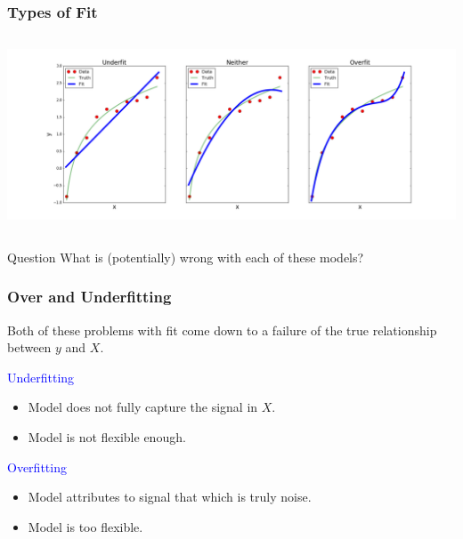 \documentclass{beamer}
\begin{document}
\begin{frame}
  \frametitle{Types of Fit}
  \begin{columns}
    \begin{center}
      \includegraphics[width=\textwidth]{images/overfitting_labeled.png}
    \end{center}
  \end{columns}

  \begin{block}{Question}
    What is (potentially) wrong with each of these models?
  \end{block}
\end{frame}

\begin{frame}
  \frametitle{Over and Underfitting}
  Both of these problems with fit come down to a failure of  the true relationship between $y$ and $X$. \vspace{3mm} \pause

  {\large \textcolor{blue}{Underfitting}}
  \begin{itemize}
    \item Model does not fully capture the signal in $X$.
    \item Model is not flexible enough.
  \end{itemize} \vspace{3mm} \pause

  {\large \textcolor{blue}{Overfitting}}
  \begin{itemize}
    \item Model attributes to signal that which is truly noise.
    \item Model is too flexible.
  \end{itemize}
\end{frame}
\end{document}
